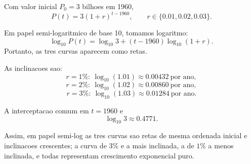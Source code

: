 Com valor inicial $P_0=3$ bilhoes em 1960,
\[
P(t)=3(1+r)^{t-1960},
\qquad r\in\{0.01,0.02,0.03\}.
\]

Em papel semi-logaritmico de base 10, tomamos logaritmo:
\[
\log_{10}P(t)=\log_{10}3+(t-1960)\log_{10}(1+r).
\]
Portanto, as tres curvas aparecem como retas.

As inclinacoes sao:
\[
r=1\%: \ \log_{10}(1.01)\approx 0.00432\ \text{por ano},
\]
\[
r=2\%: \ \log_{10}(1.02)\approx 0.00860\ \text{por ano},
\]
\[
r=3\%: \ \log_{10}(1.03)\approx 0.01284\ \text{por ano}.
\]

A interceptacao comum em $t=1960$ e
\[
\log_{10}3\approx 0.4771.
\]

Assim, em papel semi-log as tres curvas sao retas de mesma ordenada inicial e inclinacoes crescentes; a curva de $3\%$ e a mais inclinada, a de $1\%$ a menos inclinada, e todas representam crescimento exponencial puro.